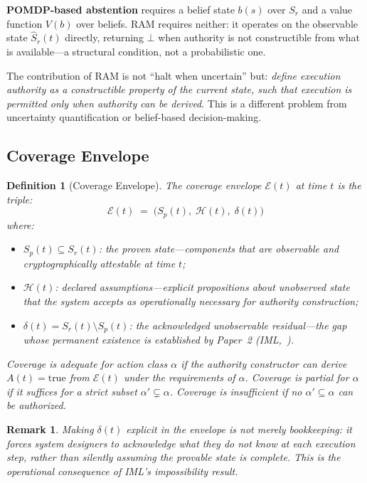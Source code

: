 \documentclass[11pt]{article}
\newtheorem{definition}{Definition}[section]
\newtheorem{remark}{Remark}[section]
\newcommand{\Sr}{S_r}
\newcommand{\Sp}{S_p}
\newcommand{\Ndefval}{\bot}
\begin{document}
\textbf{POMDP-based abstention} requires a belief state $b(s)$ over $\Sr$
and a value function $V(b)$ over beliefs.
RAM requires neither: it operates on the observable state $\hat{S}_r(t)$
directly, returning $\Ndefval$ when authority is not constructible from what
is available---a structural condition, not a probabilistic one.

The contribution of RAM is not ``halt when uncertain'' but:
\emph{define execution authority as a constructible property of the current
state, such that execution is permitted only when authority can be derived}.
This is a different problem from uncertainty quantification or belief-based
decision-making.

\subsection{Coverage Envelope}
\label{subsec:envelope}

\begin{definition}[Coverage Envelope]
The \emph{coverage envelope} $\mathcal{E}(t)$ at time $t$ is the triple:
\[
\mathcal{E}(t) \;=\; \bigl(\Sp(t),\;\mathcal{H}(t),\;\delta(t)\bigr)
\]
where:
\begin{itemize}
  \item $\Sp(t) \subseteq \Sr(t)$: the \emph{proven state}---components that
        are observable and cryptographically attestable at time $t$;
  \item $\mathcal{H}(t)$: \emph{declared assumptions}---explicit propositions
        about unobserved state that the system accepts as operationally
        necessary for authority construction;
  \item $\delta(t) = \Sr(t) \setminus \Sp(t)$: the \emph{acknowledged
        unobservable residual}---the gap whose permanent existence is
        established by Paper~2 (IML,~\cite{fernandez2026c}).
\end{itemize}
Coverage is \emph{adequate for action class $\alpha$} if the authority
constructor can derive $A(t) = \text{true}$ from $\mathcal{E}(t)$ under the
requirements of $\alpha$.
Coverage is \emph{partial for $\alpha$} if it suffices for a strict subset
$\alpha' \subsetneq \alpha$.
Coverage is \emph{insufficient} if no $\alpha' \subseteq \alpha$ can be
authorized.
\end{definition}

\begin{remark}
Making $\delta(t)$ explicit in the envelope is not merely bookkeeping: it
forces system designers to acknowledge \emph{what they do not know} at each
execution step, rather than silently assuming the provable state is complete.
This is the operational consequence of IML's impossibility result.
\end{remark}
\end{document}
